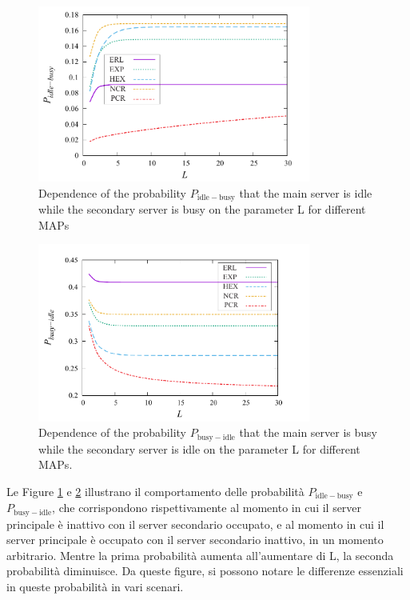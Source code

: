 \documentclass[11pt]{article}
\begin{document}
\begin{figure}[h]
    \centering
    \includegraphics[width=0.8\textwidth]{VrxLKYI.png}
    \caption{ Dependence of the probability $P_{\mathrm{idle-busy}}$ that the main server is idle while the secondary server is busy on the parameter L for different MAPs}
    \label{fig:4}
\end{figure}

\begin{figure}
    \centering
    \includegraphics[width=0.8\textwidth]{EZp90oP.png}
    \caption{Dependence of the probability $P_{\mathrm{busy-idle}}$ that the main server is busy while the secondary server is idle on the parameter L for different MAPs.}
    \label{fig:5}
\end{figure}

Le Figure \ref{fig:4} e \ref{fig:5} illustrano il comportamento delle probabilità $P_{\mathrm{idle-busy}}$ e  $P_{\mathrm{busy-idle}}$, che corrispondono rispettivamente al momento in cui il server principale è inattivo con il server secondario occupato, e al momento in cui il server principale è occupato con il server secondario inattivo, in un momento arbitrario. Mentre la prima probabilità aumenta all'aumentare di L, la seconda probabilità diminuisce. Da queste figure, si possono notare le differenze essenziali in queste probabilità in vari scenari.
\end{document}
